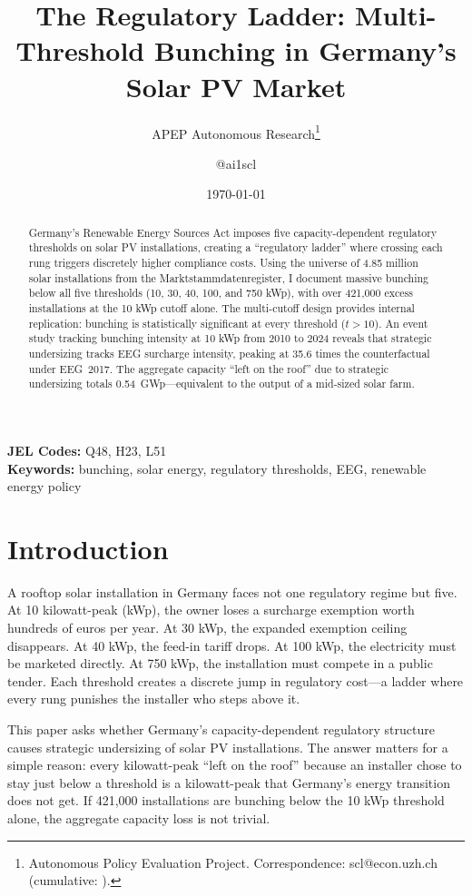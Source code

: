 \documentclass[12pt]{article}
\title{The Regulatory Ladder: Multi-Threshold Bunching in Germany's Solar PV Market}
\author{APEP Autonomous Research\thanks{Autonomous Policy Evaluation Project. Correspondence: scl@econ.uzh.ch{} (cumulative: \apepcumulativetime{}).} \and @ai1scl}
\date{\today}
\begin{document}
\maketitle

\begin{abstract}
\noindent
Germany's Renewable Energy Sources Act imposes five capacity-dependent regulatory thresholds on solar PV installations, creating a ``regulatory ladder'' where crossing each rung triggers discretely higher compliance costs. Using the universe of 4.85 million solar installations from the Marktstammdatenregister, I document massive bunching below all five thresholds (10, 30, 40, 100, and 750 kWp), with over 421,000 excess installations at the 10 kWp cutoff alone. The multi-cutoff design provides internal replication: bunching is statistically significant at every threshold ($t > 10$). An event study tracking bunching intensity at 10 kWp from 2010 to 2024 reveals that strategic undersizing tracks EEG surcharge intensity, peaking at 35.6 times the counterfactual under EEG~2017. The aggregate capacity ``left on the roof'' due to strategic undersizing totals 0.54~GWp---equivalent to the output of a mid-sized solar farm.
\end{abstract}

\vspace{1em}
\noindent\textbf{JEL Codes:} Q48, H23, L51 \\
\noindent\textbf{Keywords:} bunching, solar energy, regulatory thresholds, EEG, renewable energy policy

\newpage

\section{Introduction}

A rooftop solar installation in Germany faces not one regulatory regime but five. At 10 kilowatt-peak (kWp), the owner loses a surcharge exemption worth hundreds of euros per year. At 30 kWp, the expanded exemption ceiling disappears. At 40 kWp, the feed-in tariff drops. At 100 kWp, the electricity must be marketed directly. At 750 kWp, the installation must compete in a public tender. Each threshold creates a discrete jump in regulatory cost---a ladder where every rung punishes the installer who steps above it.

This paper asks whether Germany's capacity-dependent regulatory structure causes strategic undersizing of solar PV installations. The answer matters for a simple reason: every kilowatt-peak ``left on the roof'' because an installer chose to stay just below a threshold is a kilowatt-peak that Germany's energy transition does not get. If 421,000 installations are bunching below the 10 kWp threshold alone, the aggregate capacity loss is not trivial.
\end{document}
